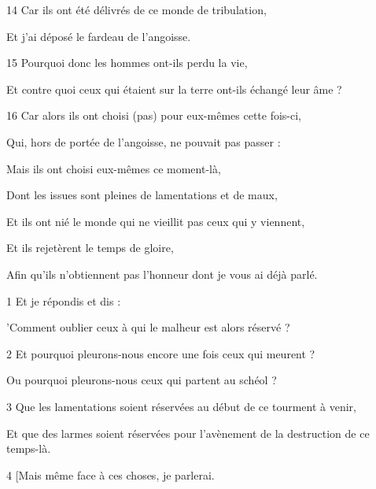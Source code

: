\par 14 Car ils ont été délivrés de ce monde de tribulation,

\par Et j'ai déposé le fardeau de l'angoisse.

\par 15 Pourquoi donc les hommes ont-ils perdu la vie,

\par Et contre quoi ceux qui étaient sur la terre ont-ils échangé leur âme ?

\par 16 Car alors ils ont choisi (pas) pour eux-mêmes cette fois-ci,

\par Qui, hors de portée de l'angoisse, ne pouvait pas passer :

\par Mais ils ont choisi eux-mêmes ce moment-là,

\par Dont les issues sont pleines de lamentations et de maux,

\par Et ils ont nié le monde qui ne vieillit pas ceux qui y viennent,

\par Et ils rejetèrent le temps de gloire,

\par Afin qu'ils n'obtiennent pas l'honneur dont je vous ai déjà parlé.


\par 1 Et je répondis et dis :

\par 'Comment oublier ceux à qui le malheur est alors réservé ?

\par 2 Et pourquoi pleurons-nous encore une fois ceux qui meurent ?

\par Ou pourquoi pleurons-nous ceux qui partent au schéol ?

\par 3 Que les lamentations soient réservées au début de ce tourment à venir,

\par Et que des larmes soient réservées pour l'avènement de la destruction de ce temps-là.

\par 4 [Mais même face à ces choses, je parlerai.

